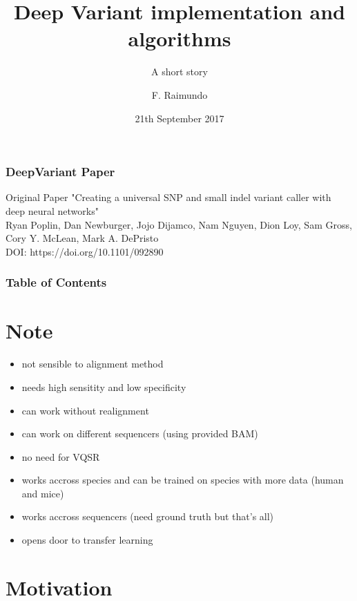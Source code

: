 \documentclass{beamer}
\title[Deep Variant] %
{Deep Variant implementation and algorithms}
\subtitle{A short story}
\author[Raimundo] %
{F. Raimundo\inst{1}}
\institute[] %
{
  \inst{1}%
  CEDAR\\
  École Polytechnique
}
\date[] %
{21th September 2017}
\begin{document}
\frame{\titlepage}

\begin{frame}
\frametitle{DeepVariant Paper}

\begin{block}{Original Paper}
"Creating a universal SNP and small indel variant caller with deep neural networks"\\
Ryan Poplin, Dan Newburger, Jojo Dijamco, Nam Nguyen, Dion Loy, Sam Gross, Cory Y. McLean,
Mark A. DePristo\\
DOI: https://doi.org/10.1101/092890
\end{block}

\end{frame}

\begin{frame}
\frametitle{Table of Contents}
\tableofcontents
\end{frame}

\section{Note}
\begin{frame}
    \begin{itemize}
     \item not sensible to alignment method
     \item needs high sensitity and low specificity
     \item can work without realignment
     \item can work on different sequencers (using provided BAM)
     \item no need for VQSR
     \item works accross species and can be trained on species with more data (human and mice)
     \item works accross sequencers (need ground truth but that's all)
     \item opens door to transfer learning
    \end{itemize}
\end{frame}

\section{Motivation}
\end{document}

